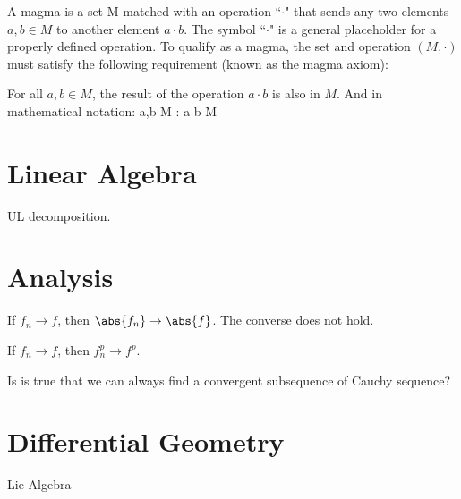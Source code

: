 \begin{definition}
A magma is a set M matched with an operation ``$\cdot$" that sends any two elements $a,b \in M$ to another element $a \cdot b$. The symbol ``$\cdot$" is a general placeholder for a properly defined operation. To qualify as a magma, the set and operation $(M,\cdot)$ must satisfy the following requirement (known as the magma axiom):

For all $a, b \in M$, the result of the operation $a \cdot b$ is also in $M$. And in mathematical notation:
\be
\forall a,b \in M : a \cdot b \in M 
\ee
\end{definition}

\section{Linear Algebra}

\ben
\item [(i)] UL decomposition.
\een

\section{Analysis}
\ben
\item [(i)] If $f_n \to f$, then $\abs{f_n} \to \abs{f}$. The converse does not hold.
\item [(ii)] If $f_n \to f$, then $f_n^p \to f^p$.
\item [(iii)] Is is true that we can always find a convergent subsequence of Cauchy sequence?
\een


\section{Differential Geometry}

\ben
\item [(i)] Lie Algebra
\een

